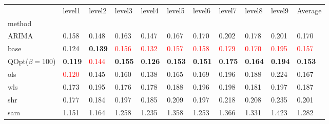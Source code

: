 \begin{tabular}{lllllllllll}
\toprule
 & level1 & level2 & level3 & level4 & level5 & level6 & level7 & level8 & level9 & Average \\
method &  &  &  &  &  &  &  &  &  &  \\
\midrule
ARIMA & 0.158 & 0.148 & 0.163 & 0.147 & 0.167 & 0.170 & 0.202 & 0.178 & 0.201 & 0.170 \\
base & 0.124 & \textbf{0.139} & \textcolor{red}{0.156} & \textcolor{red}{0.132} & \textcolor{red}{0.157} & \textcolor{red}{0.158} & \textcolor{red}{0.179} & \textcolor{red}{0.170} & \textcolor{red}{0.195} & \textcolor{red}{0.157} \\
\midrule
QOpt($\beta=100$) & \textbf{0.119} & \textcolor{red}{0.144} & \textbf{0.155} & \textbf{0.126} & \textbf{0.153} & \textbf{0.151} & \textbf{0.175} & \textbf{0.164} & \textbf{0.194} & \textbf{0.153} \\
ols & \textcolor{red}{0.120} & 0.145 & 0.160 & 0.138 & 0.165 & 0.169 & 0.196 & 0.188 & 0.224 & 0.167 \\
wls & 0.173 & 0.195 & 0.176 & 0.178 & 0.188 & 0.196 & 0.198 & 0.181 & 0.197 & 0.187 \\
shr & 0.177 & 0.184 & 0.197 & 0.185 & 0.209 & 0.197 & 0.218 & 0.208 & 0.235 & 0.201 \\
sam & 1.151 & 1.164 & 1.258 & 1.235 & 1.358 & 1.253 & 1.366 & 1.331 & 1.423 & 1.282 \\
\bottomrule
\end{tabular}